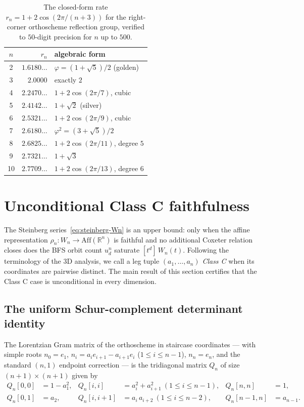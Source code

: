 \documentclass[11pt,a4paper]{article}
\theoremstyle{remark}
\theoremstyle{plain}
\begin{document}
\begin{table}[ht!]
\centering
\small
\renewcommand{\arraystretch}{1.15}
\begin{tabular}{c r l}
\toprule
$n$ & $r_n$ & algebraic form \\
\midrule
2  & $1.6180\ldots$ & $\varphi = (1+\sqrt 5)/2$ (golden) \\
3  & $2.0000$       & exactly $2$ \\
4  & $2.2470\ldots$ & $1 + 2\cos(2\pi/7)$, cubic \\
5  & $2.4142\ldots$ & $1 + \sqrt 2$ (silver) \\
6  & $2.5321\ldots$ & $1 + 2\cos(2\pi/9)$, cubic \\
7  & $2.6180\ldots$ & $\varphi^2 = (3+\sqrt 5)/2$ \\
8  & $2.6825\ldots$ & $1 + 2\cos(2\pi/11)$, degree $5$ \\
9  & $2.7321\ldots$ & $1 + \sqrt 3$ \\
10 & $2.7709\ldots$ & $1 + 2\cos(2\pi/13)$, degree $6$ \\
\bottomrule
\end{tabular}
\caption{The closed-form rate $r_n = 1 + 2\cos(2\pi/(n+3))$ for
the right-corner orthoscheme reflection group, verified to $50$-digit
precision for $n$ up to $500$.}
\label{tab:n-dim-rates}
\end{table}

\section{Unconditional Class C faithfulness}\label{sec:classC}

The Steinberg series~\eqref{eq:steinberg-Wn} is an upper bound: only
when the affine representation $\rho_n : W_n \to \mathrm{Aff}(\mathbb{R}^n)$
is faithful and no additional Coxeter relation closes does the BFS
orbit count $u_d^n$ saturate $[t^d]\, W_n(t)$.  Following the
terminology of the 3D analysis, we call a leg tuple
$(a_1, \ldots, a_n)$ \emph{Class C} when its coordinates are
pairwise distinct.  The main result of this section certifies that
the Class C case is unconditional in every dimension.

\subsection{The uniform Schur-complement determinant identity}

The Lorentzian Gram matrix of the orthoscheme in staircase
coordinates --- with simple roots $n_0 = e_1$,
$n_i = a_i e_{i+1} - a_{i+1} e_i$ ($1 \le i \le n-1$), $n_n = e_n$,
and the standard $(n, 1)$ endpoint correction --- is the tridiagonal
matrix $Q_n$ of size $(n+1) \times (n+1)$ given by
\begin{align*}
Q_n[0,0] &= 1 - a_1^2, & Q_n[i,i] &= a_i^2 + a_{i+1}^2\ (1 \le i \le n-1),
& Q_n[n,n] &= 1, \\
Q_n[0,1] &= a_2, & Q_n[i,i+1] &= a_i\, a_{i+2}\ (1 \le i \le n-2),
& Q_n[n-1,n] &= a_{n-1}.
\end{align*}
\end{document}
